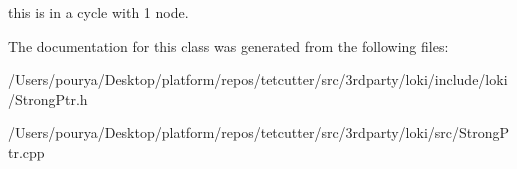 this is in a cycle with 1 node. 

The documentation for this class was generated from the following files\+:\begin{DoxyCompactItemize}
\item 
/\+Users/pourya/\+Desktop/platform/repos/tetcutter/src/3rdparty/loki/include/loki/Strong\+Ptr.\+h\item 
/\+Users/pourya/\+Desktop/platform/repos/tetcutter/src/3rdparty/loki/src/Strong\+Ptr.\+cpp\end{DoxyCompactItemize}
